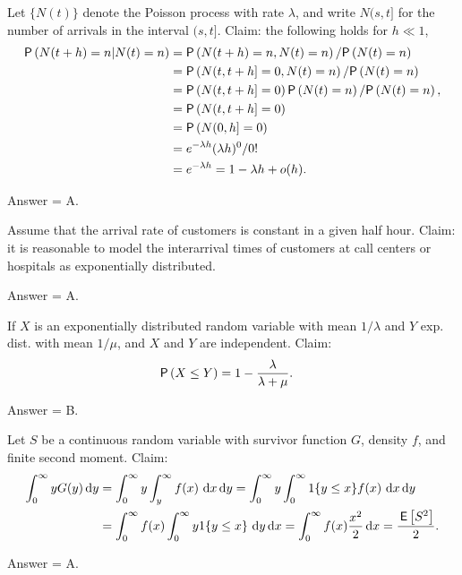 \begin{exercise}[201807]
Let $\{N(t)\}$ denote the Poisson process with rate $\lambda$, and write $N(s, t]$ for the number of arrivals in the interval $(s,t]$. Claim: the following holds for $h\ll 1$, 
 \begin{align*}
 \P{N(t+h) = n | N(t) = n} 
&= \P{N(t+h) = n, N(t) = n}/\P{N(t)=n} \\
&= \P{N(t, t+h] = 0, N(t) = n}/\P{N(t)=n} \\
&= \P{N(t, t+h] = 0} \P{N(t) = n}/\P{N(t)=n}, \\
&= \P{N(t, t+h] = 0} \\
&= \P{N(0, h] = 0} \\
&= e^{-\lambda h} (\lambda h)^0/0! \\
&= e^{-\lambda h} = 1-\lambda h + o(h).
 \end{align*}
\begin{solution}
Answer = A.
\end{solution}
\end{exercise}



\begin{exercise}[201807]
Assume that the arrival rate of customers is constant in a given half hour. Claim: it is reasonable to model the interarrival times of customers at call centers or hospitals as exponentially distributed.
\begin{solution}
Answer = A.
\end{solution}
\end{exercise}

\begin{exercise}[201807]
If $X$ is an exponentially distributed random variable with mean $1/\lambda$ and $Y$ exp. dist. with mean $1/\mu$, and $X$ and $Y$ are independent. Claim:
\begin{align*}
 \P{X\leq Y} 
&= 1 - \frac{\lambda}{\lambda + \mu}.
\end{align*}

\begin{solution}
Answer = B.
\end{solution}
\end{exercise}

\begin{exercise}[201807]
Let $S$ be a continuous random variable with survivor function $G$, density $f$, and finite second moment. Claim:
 \begin{align*}
\int_0^\infty y G(y) \,\text{d}y 
&= \int_0^\infty y \int_y^\infty f(x)\, \,\text{d}x \,\text{d}y = \int_0^\infty y \int_0^\infty 1\{y\leq x\}f(x)\, \,\text{d}x \,\text{d}y\\
&= \int_0^\infty f(x) \int_0^\infty y 1\{y \leq x\}\, \,\text{d}y \,\text{d}x
= \int_0^\infty f(x) \frac{x^2}2 \,\text{d}x =\frac{\,\mathsf{E}\left[S^2\right]}2.
 \end{align*}

\begin{solution}
Answer = A.
\end{solution}
\end{exercise}




